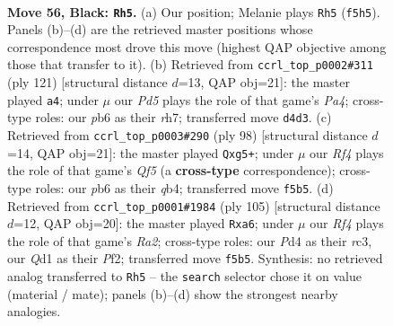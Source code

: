 \documentclass[11pt]{article}
\begin{document}
\clearpage

\begin{figure}[p]\centering
\begin{subfigure}{0.46\textwidth}\centering
\resizebox{\linewidth}{!}{%
\newchessgame
\chessboard[
  setfen={8/6pk/1P6/5r2/3ppP2/8/6K1/3q4 b - - 2 56},
  showmover=false,
  pgfstyle=straightmove, color=movearrow, markmove={f5-h5}
]}
\caption{}
\end{subfigure}\hfill
\begin{subfigure}{0.46\textwidth}\centering
\resizebox{\linewidth}{!}{%
\newchessgame
\chessboard[
  setfen={8/7R/8/p1pk4/8/r7/P1K5/8 b - - 13 61},
  showmover=false,
  pgfstyle=straightmove, color=movearrow, markmove={a5-a4}
]}
\caption{}
\end{subfigure}
\\[4pt]
\begin{subfigure}{0.46\textwidth}\centering
\resizebox{\linewidth}{!}{%
\newchessgame
\chessboard[
  setfen={8/6k1/8/5QpP/1q6/8/5PK1/8 w - - 2 50},
  showmover=false,
  pgfstyle=straightmove, color=movearrow, markmove={f5-g5}
]}
\caption{}
\end{subfigure}\hfill
\begin{subfigure}{0.46\textwidth}\centering
\resizebox{\linewidth}{!}{%
\newchessgame
\chessboard[
  setfen={6k1/r6p/P7/8/P5P1/2R5/5p2/5K2 b - - 0 53},
  showmover=false,
  pgfstyle=straightmove, color=movearrow, markmove={a7-a6}
]}
\caption{}
\end{subfigure}
\caption{\textbf{Move 56, Black: \texttt{Rh5}.} (a) Our position; Melanie plays \texttt{Rh5} (\texttt{f5h5}). Panels (b)--(d) are the retrieved master positions whose correspondence most drove this move (highest QAP objective among those that transfer to it). (b) Retrieved from \texttt{ccrl\_top\_p0002\#311} (ply 121) [structural distance $d$=13, QAP obj=21]: the master played \texttt{a4}; under $\mu$ our \emph{Pd5} plays the role of that game's \emph{Pa4}; cross-type roles: our \emph{p}b6 as their \emph{r}h7; transferred move \texttt{d4d3}. (c) Retrieved from \texttt{ccrl\_top\_p0003\#290} (ply 98) [structural distance $d$=14, QAP obj=21]: the master played \texttt{Qxg5+}; under $\mu$ our \emph{Rf4} plays the role of that game's \emph{Qf5} (a \textbf{cross-type} correspondence); cross-type roles: our \emph{p}b6 as their \emph{q}b4; transferred move \texttt{f5b5}. (d) Retrieved from \texttt{ccrl\_top\_p0001\#1984} (ply 105) [structural distance $d$=12, QAP obj=20]: the master played \texttt{Rxa6}; under $\mu$ our \emph{Rf4} plays the role of that game's \emph{Ra2}; cross-type roles: our \emph{P}d4 as their \emph{r}c3, our \emph{Q}d1 as their \emph{P}f2; transferred move \texttt{f5b5}. Synthesis: no retrieved analog transferred to \texttt{Rh5} -- the \texttt{search} selector chose it on value (material / mate); panels (b)--(d) show the strongest nearby analogies.}
\label{fig:thought-m111}
\end{figure}
\end{document}
